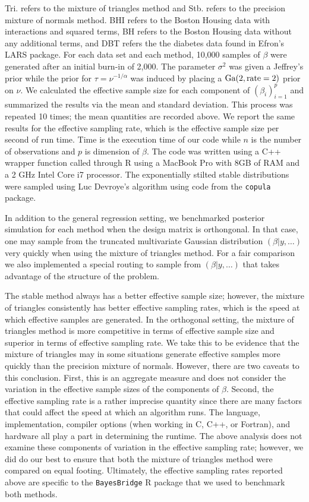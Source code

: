 \documentclass{article}
\begin{document}
Tri. refers to the mixture of triangles method and Stb. refers to the precision
mixture of normals method.  BHI refers to the Boston Housing data with
interactions and squared terms, BH refers to the Boston Housing data without any
additional terms, and DBT refers the the diabetes data found in Efron's LARS
package. For each data set and each method, 10,000 samples of $\beta$ were
generated after an initial burn-in of 2,000.  The parameter $\sigma^2$ was given
a Jeffrey's prior while the prior for $\tau = \nu^{-1/\alpha}$ was induced by
placing a $\textmd{Ga}(2, \textmd{rate}=2)$ prior on $\nu$.  We calculated the
effective sample size for each component of $(\beta_i)_{i=1}^p$ and summarized
the results via the mean and standard deviation.  This process was repeated 10
times; the mean quantities are recorded above.  We report the same results for
the effective sampling rate, which is the effective sample size per second of
run time.  Time is the execution time of our code while $n$ is the number of
observations and $p$ is dimension of $\beta$.  The code was written using a C++
wrapper function called through R using a MacBook Pro with 8GB of RAM and a 2
GHz Intel Core i7 processor.  The exponentially stilted stable distributions
were sampled using Luc Devroye's algorithm using code from the \texttt{copula}
package.

In addition to the general regression setting, we benchmarked posterior
simulation for each method when the design matrix is orthongonal.  In that case,
one may sample from the truncated multivariate Gaussian distribution $(\beta |
y, \ldots)$ very quickly when using the mixture of triangles method.  For a fair
comparison we also implemented a special routing to sample from $(\beta | y,
\ldots)$ that takes advantage of the structure of the problem.

The stable method always has a better effective sample size; however, the
mixture of triangles consistently has better effective sampling rates, which is
the speed at which effective samples are generated.  In the orthogonal setting,
the mixture of triangles method is more competitive in terms of effective sample
size and superior in terms of effective sampling rate. We take this to be
evidence that the mixture of triangles may in some situations generate effective
samples more quickly than the precision mixture of normals.  However, there are
two caveats to this conclusion.  First, this is an aggregate measure and does
not consider the variation in the effective sample sizes of the components of
$\beta$.  Second, the effective sampling rate is a rather imprecise quantity
since there are many factors that could affect the speed at which an algorithm
runs.  The language, implementation, compiler options (when working in C, C++,
or Fortran), and hardware all play a part in determining the runtime.  The above
analysis does not examine these components of variation in the effective
sampling rate; however, we did do our best to ensure that both the mixture of
triangles method were compared on equal footing.  Ultimately, the effective
sampling rates reported above are specific to the \texttt{BayesBridge} R package
that we used to benchmark both methods.


{}

\end{document}
